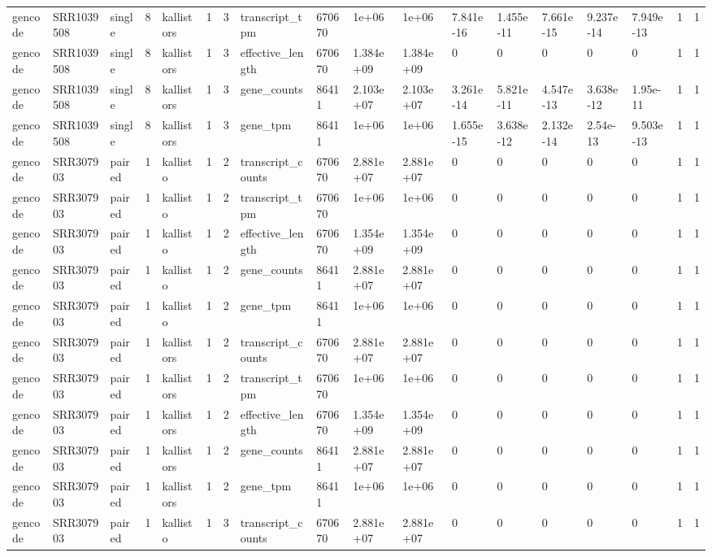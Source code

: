 \begin{tabular}{llllllllllllllllll}
gencode & SRR1039508 & single & 8 & kallistors & 1 & 3 & transcript\_tpm & 670670 & 1e+06 & 1e+06 & 7.841e-16 & 1.455e-11 & 7.661e-15 & 9.237e-14 & 7.949e-13 & 1 & 1 \\
gencode & SRR1039508 & single & 8 & kallistors & 1 & 3 & effective\_length & 670670 & 1.384e+09 & 1.384e+09 & 0 & 0 & 0 & 0 & 0 & 1 & 1 \\
gencode & SRR1039508 & single & 8 & kallistors & 1 & 3 & gene\_counts & 86411 & 2.103e+07 & 2.103e+07 & 3.261e-14 & 5.821e-11 & 4.547e-13 & 3.638e-12 & 1.95e-11 & 1 & 1 \\
gencode & SRR1039508 & single & 8 & kallistors & 1 & 3 & gene\_tpm & 86411 & 1e+06 & 1e+06 & 1.655e-15 & 3.638e-12 & 2.132e-14 & 2.54e-13 & 9.503e-13 & 1 & 1 \\
gencode & SRR307903 & paired & 1 & kallisto & 1 & 2 & transcript\_counts & 670670 & 2.881e+07 & 2.881e+07 & 0 & 0 & 0 & 0 & 0 & 1 & 1 \\
gencode & SRR307903 & paired & 1 & kallisto & 1 & 2 & transcript\_tpm & 670670 & 1e+06 & 1e+06 & 0 & 0 & 0 & 0 & 0 & 1 & 1 \\
gencode & SRR307903 & paired & 1 & kallisto & 1 & 2 & effective\_length & 670670 & 1.354e+09 & 1.354e+09 & 0 & 0 & 0 & 0 & 0 & 1 & 1 \\
gencode & SRR307903 & paired & 1 & kallisto & 1 & 2 & gene\_counts & 86411 & 2.881e+07 & 2.881e+07 & 0 & 0 & 0 & 0 & 0 & 1 & 1 \\
gencode & SRR307903 & paired & 1 & kallisto & 1 & 2 & gene\_tpm & 86411 & 1e+06 & 1e+06 & 0 & 0 & 0 & 0 & 0 & 1 & 1 \\
gencode & SRR307903 & paired & 1 & kallistors & 1 & 2 & transcript\_counts & 670670 & 2.881e+07 & 2.881e+07 & 0 & 0 & 0 & 0 & 0 & 1 & 1 \\
gencode & SRR307903 & paired & 1 & kallistors & 1 & 2 & transcript\_tpm & 670670 & 1e+06 & 1e+06 & 0 & 0 & 0 & 0 & 0 & 1 & 1 \\
gencode & SRR307903 & paired & 1 & kallistors & 1 & 2 & effective\_length & 670670 & 1.354e+09 & 1.354e+09 & 0 & 0 & 0 & 0 & 0 & 1 & 1 \\
gencode & SRR307903 & paired & 1 & kallistors & 1 & 2 & gene\_counts & 86411 & 2.881e+07 & 2.881e+07 & 0 & 0 & 0 & 0 & 0 & 1 & 1 \\
gencode & SRR307903 & paired & 1 & kallistors & 1 & 2 & gene\_tpm & 86411 & 1e+06 & 1e+06 & 0 & 0 & 0 & 0 & 0 & 1 & 1 \\
gencode & SRR307903 & paired & 1 & kallisto & 1 & 3 & transcript\_counts & 670670 & 2.881e+07 & 2.881e+07 & 0 & 0 & 0 & 0 & 0 & 1 & 1 \\

\end{tabular}
